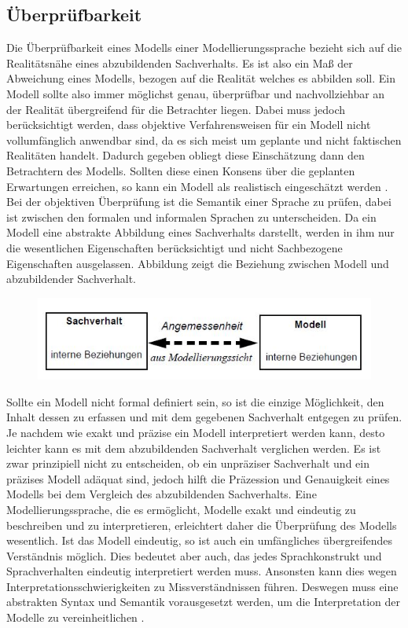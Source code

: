 \subsection{Überprüfbarkeit}
Die Überprüfbarkeit eines Modells einer Modellierungssprache bezieht sich auf die Realitätsnähe eines abzubildenden Sachverhalts. Es ist also ein Maß der Abweichung eines Modells, bezogen auf die Realität welches es abbilden soll.
Ein Modell sollte also immer möglichst genau, überprüfbar und nachvollziehbar an der Realität übergreifend für die Betrachter liegen. Dabei muss jedoch berücksichtigt werden, dass objektive Verfahrensweisen für ein Modell nicht vollumfänglich anwendbar sind, da es sich meist um geplante und nicht faktischen Realitäten handelt. Dadurch gegeben obliegt diese Einschätzung  dann den Betrachtern des Modells. Sollten diese einen Konsens über die geplanten Erwartungen erreichen, so kann ein Modell als realistisch eingeschätzt werden \cite[3]{Becker_2012}. Bei der objektiven Überprüfung ist die Semantik einer Sprache zu prüfen, dabei ist zwischen den formalen und informalen Sprachen zu unterscheiden. Da ein Modell eine abstrakte Abbildung eines Sachverhalts darstellt, werden in ihm nur die wesentlichen Eigenschaften berücksichtigt und nicht Sachbezogene Eigenschaften ausgelassen. Abbildung \pageref{fig:Beziehung} zeigt die Beziehung zwischen Modell und abzubildender Sachverhalt.
	\begin{figure}[h]
		\includegraphics[width=\textwidth]{Graphics/Sachverhalt.jpg}
		\label{fig:Beziehung}
	\end{figure}
Sollte ein Modell nicht formal definiert sein, so ist die einzige Möglichkeit, den Inhalt dessen zu erfassen und mit dem gegebenen Sachverhalt entgegen zu prüfen. Je nachdem wie exakt und präzise ein Modell interpretiert werden kann, desto leichter kann es mit dem abzubildenden Sachverhalt verglichen werden. Es ist zwar prinzipiell nicht zu entscheiden, ob ein unpräziser Sachverhalt und ein präzises Modell adäquat sind, jedoch hilft die Präzession und Genauigkeit eines Modells bei dem Vergleich des abzubildenden Sachverhalts. Eine Modellierungssprache, die es ermöglicht, Modelle exakt und eindeutig zu beschreiben
und zu interpretieren, erleichtert daher die Überprüfung des Modells wesentlich. Ist das Modell eindeutig, so ist auch ein umfängliches übergreifendes Verständnis möglich. Dies bedeutet aber auch, das jedes Sprachkonstrukt und Sprachverhalten eindeutig interpretiert werden muss. Ansonsten kann dies wegen Interpretationsschwierigkeiten zu Missverständnissen führen. Deswegen muss eine abstrakten Syntax und Semantik vorausgesetzt werden, um die Interpretation der Modelle zu vereinheitlichen \cite[35F]{Frank_1997}.
